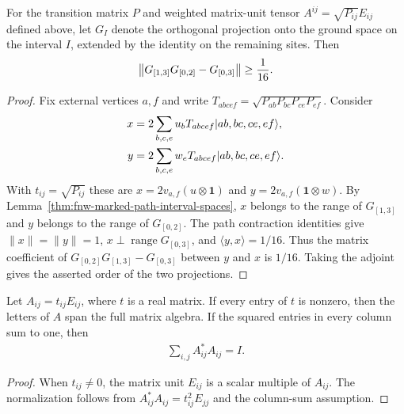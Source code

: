 \begin{lemma}
    \label{thm:fnw-dimension-four-physical-defect}
    \leanok
    For the transition matrix $P$ and weighted matrix-unit tensor
    $A^{ij}=\sqrt{P_{ij}}E_{ij}$ defined above, let $G_I$ denote the
    orthogonal projection onto the ground space on the interval $I$,
    extended by the identity on the remaining sites. Then
    \begin{align}
        \left\|G_{[1,3]}G_{[0,2]}-G_{[0,3]}\right\|
        \geq \frac1{16}. \notag
    \end{align}
\end{lemma}
\begin{proof}\leanok
    Fix external vertices $a,f$ and write
    $T_{abcef}=\sqrt{P_{ab}P_{bc}P_{ce}P_{ef}}$. Consider
    \begin{align}
        x & =2\sum_{b,c,e}u_bT_{abcef}|ab,bc,ce,ef\rangle,\notag \\
        y & =2\sum_{b,c,e}w_eT_{abcef}|ab,bc,ce,ef\rangle.\notag
    \end{align}
    With $t_{ij}=\sqrt{P_{ij}}$ these are $x=2v_{a,f}(u\otimes\mathbf 1)$ and
    $y=2v_{a,f}(\mathbf 1\otimes w)$. By
    Lemma~\ref{thm:fnw-marked-path-interval-spaces}, $x$ belongs to the
    range of $G_{[1,3]}$ and $y$ belongs to the range of $G_{[0,2]}$. The path contraction identities give
    $\|x\|=\|y\|=1$, $x\perp\operatorname{range}G_{[0,3]}$, and
    $\langle y,x\rangle=1/16$. Thus the matrix coefficient of
    $G_{[0,2]}G_{[1,3]}-G_{[0,3]}$ between $y$ and $x$ is $1/16$.
    Taking the adjoint gives the asserted order of the two projections.
\end{proof}

\begin{lemma}
    \label{thm:weighted-matrix-unit-normalization}
    \leanok
    Let $A_{ij}=t_{ij}E_{ij}$, where $t$ is a real matrix.
    If every entry of $t$ is nonzero, then the letters of $A$ span the full
    matrix algebra. If the squared entries in every column sum to one, then
    \begin{align}
        \sum_{i,j} A_{ij}^*A_{ij}=I.
    \end{align}
\end{lemma}
\begin{proof}
    \leanok
    When $t_{ij}\ne0$, the matrix unit $E_{ij}$ is a scalar multiple of
    $A_{ij}$. The normalization follows from
    $A_{ij}^*A_{ij}=t_{ij}^2E_{jj}$ and the column-sum assumption.
\end{proof}

